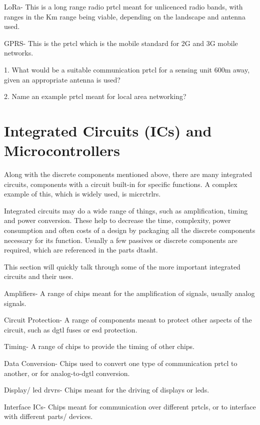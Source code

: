 \documentclass[a4paper,11pt]{report}
\newcommand{\Quiz}[1] %
{
\par\noindent %
\phantomsection %
\todo[inline, color=blue!30]{\textbf{#1}} %
\vspace{1em} %
}
\begin{document}
LoRa- This is a long range radio \gls{prtcl} meant for unlicenced radio bands, with ranges in the Km range being viable, depending on the landscape and antenna used.

GPRS- This is the \gls{prtcl} which is the mobile standard for 2G and 3G mobile networks.

\Quiz{Quiz}

1. What would be a suitable communication \gls{prtcl} for a sensing unit 600m away, given an appropriate antenna is used?

2. Name an example \gls{prtcl} meant for local area networking?

\pagebreak

\section{Integrated Circuits (ICs) and Microcontrollers}

Along with the discrete components mentioned above, there are many integrated circuits, components with a circuit built-in for specific functions. A complex example of this, which is widely used, is \gls{micrctrlr}s.

Integrated circuits may do a wide range of things, such as amplification, timing and power conversion. These help to decrease the time, complexity, power consumption and often costs of a design by packaging all the discrete components necessary for its function. Usually a few passives or discrete components are required, which are referenced in the parts \gls{dtasht}.

This section will quickly talk through some of the more important integrated circuits and their uses.

Amplifiers- A range of chips meant for the amplification of signals, usually analog signals.

Circuit Protection- A range of components meant to protect other aspects of the circuit, such as \gls{dgtl} fuses or \gls{esd} protection.

Timing- A range of chips to provide the timing of other chips.

Data Conversion- Chips used to convert one type of communication \gls{prtcl} to another, or for analog-to-\gls{dgtl} conversion.

Display/ \gls{led} \gls{drvr}s- Chips meant for the driving of displays or \gls{led}s.

Interface ICs- Chips meant for communication over different \gls{prtcl}s, or to interface with different parts/ devices.
\end{document}
